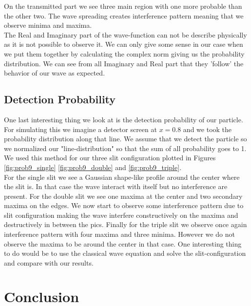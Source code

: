 \documentclass[english,notitlepage,reprint,nofootinbib]{revtex4-2}  %
\begin{document}
	On the transmitted part we see three main region with one more probable than the other 
	two. The wave spreading creates interference pattern meaning that we observe minima and 
	maxima. \\
	
	The Real and Imaginary part of the wave-function can not be describe physically as it 
	is not possible to observe it. We can only give some sense in our case when we put them
	together by calculating the complex norm giving us the probability distribution. We can 
	see from all Imaginary and Real part that they 'follow' the behavior of our wave as 
	expected. 
	
	
	\subsection{Detection Probability} \label{subsec:detec_prob}
	
	One last interesting thing we look at is the detection probability of our particle. 
	For simulating this we imagine a detector screen at $x=0.8$ and we took the probability
	distribution along that line. We assume that we detect the particle so we normalized 
	our "line-distribution" so that the sum of all probability goes to 1. We used this method
	for our three slit configuration plotted in Figures \ref{fig:prob9_single} \ref{fig:prob9_double}
	and \ref{fig:prob9_triple}. \\
	
	For the single slit we see a Gaussian shape-like profile around the center where the slit
	is. In that case the wave interact with itself but no interference are present.	For the
	double slit we see one maxima at the center and two secondary maxima on the edges. We now
	start to observe some interference pattern due to slit configuration making the wave 
	interfere constructively on the maxima and destructively in between the pics. Finally for
	the triple slit we observe once again interference pattern with four maxima and three 
	minima. However we do not observe the maxima to be around the center in that case. One 
	interesting thing to do would be to use the classical wave equation and solve the 
	slit-configuration and compare with our results. 
	
	
	
	\section{Conclusion}\label{sec:conclusion}
	
\end{document}
